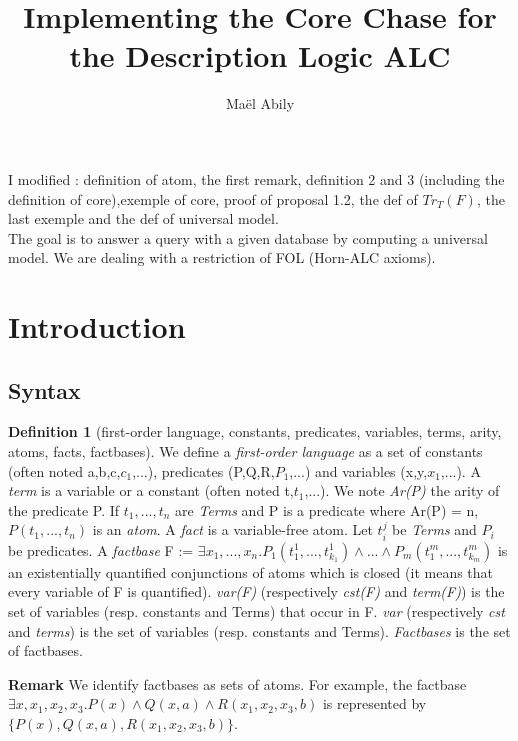 \documentclass{article}
\title{Implementing the Core Chase for the Description Logic ALC}
\author{Maël Abily}	%
\theoremstyle{proposal}
\theoremstyle{definition}
\newtheorem{definition}{Definition}[section]
\theoremstyle{theorem}
\theoremstyle{example}
\theoremstyle{remark}
\begin{document}
\maketitle						%


I modified : definition of atom, the first remark, definition 2 and 3 (including the definition of core),exemple of core, proof of proposal 1.2, the def of $Tr_{T}(F)$, the last exemple and the def of universal model. \\
The goal is to answer a query with a given database  by computing a universal model. We are dealing with a restriction of FOL (Horn-ALC axioms).

\section{Introduction}

\subsection{Syntax}

\begin{definition}[first-order language, constants, predicates, variables, terms, arity, atoms, facts, factbases] We define a \emph{first-order language} as a set of constants (often noted a,b,c,$c_{1}$,...), predicates (P,Q,R,$P_{1}$,...) and variables (x,y,$x_{1}$,...). A \emph{term} is a variable or a constant (often noted t,$t_{1}$,...). We note \emph{Ar(P)} the arity of the predicate P. If $t_1,...,t_n$ are \textit{Terms} and P is a predicate where Ar(P) = n, $P(t_{1},...,t_{n})$ is an \emph{atom}. A \emph{fact} is a variable-free atom. Let $t_i^j$ be \textit{Terms} and $P_i$ be predicates. A \emph{factbase} F := $\exists x_{1},...,x_{n}.P_{1}(t_{1}^{1},...,t_{k_{1}}^{1})\land ...\land P_{m}(t_{1}^{m},...,t_{k_{m}}^{m})$ is an existentially quantified conjunctions of atoms which is closed (it means that every variable of F is quantified). \emph{var(F)} (respectively \emph{cst(F)} and \emph{term(F)}) is the set of variables (resp. constants and Terms) that occur in F. \emph{var} (respectively \emph{cst} and \emph{terms}) is the set of variables (resp. constants and Terms). \emph{Factbases} is the set of factbases.
\end{definition}
\noindent \textbf{Remark} We identify factbases as sets of atoms. For example, the factbase $\exists x,x_{1},x_{2},x_{3}. P(x) \land Q(x,a) \land R(x_{1},x_{2},x_{3},b)$ is represented by \\
$\{P(x),Q(x,a),R(x_{1},x_{2},x_{3},b)\}$.
\end{document}
